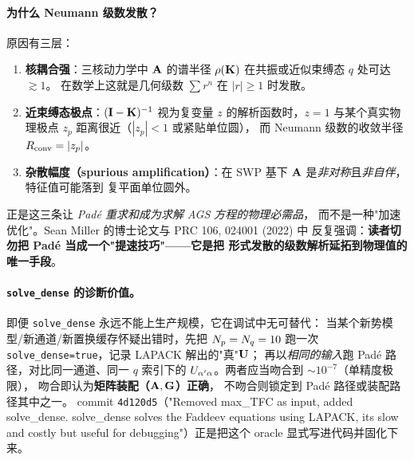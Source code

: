 \paragraph{为什么 Neumann 级数发散？}
原因有三层：
\begin{enumerate}
  \item \textbf{核耦合强}：三核动力学中 \(\mathbf{A}\) 的谱半径
        \(\rho(\mathbf{K})\) 在共振或近似束缚态 \(q\) 处可达 \(\gtrsim 1\)。
        在数学上这就是几何级数 \(\sum r^n\) 在 \(|r| \ge 1\) 时发散。
  \item \textbf{近束缚态极点}：\((\mathbf{I} - \mathbf{K})^{-1}\)
        视为复变量 \(z\) 的解析函数时，\(z = 1\) 与某个真实物理极点
        \(z_p\) 距离很近（\(|z_p| < 1\) 或紧贴单位圆），
        而 Neumann 级数的收敛半径 \(R_{\text{conv}} = |z_p|\)。
  \item \textbf{杂散幅度（spurious amplification）}：在 SWP 基下
        \(\mathbf{A}\) 是\emph{非对称}且\emph{非自伴}，特征值可能落到
        复平面单位圆外。
\end{enumerate}
正是这三条让 \emph{Padé 重求和成为求解 AGS 方程的物理必需品}，
而不是一种"加速优化"。Sean Miller 的博士论文与 PRC 106, 024001 (2022) 中
反复强调：\textbf{读者切勿把 Padé 当成一个"提速技巧"——它是把
形式发散的级数解析延拓到物理值的唯一手段}。

\paragraph{\texttt{solve\_dense} 的诊断价值。}
即便 \texttt{solve\_dense} 永远不能上生产规模，它在调试中无可替代：
当某个新势模型/新通道/新置换缓存怀疑出错时，先把 \(N_p=N_q=10\) 跑一次
\texttt{solve\_dense=true}，记录 LAPACK 解出的"真"\(\mathbf{U}\)；
再以\emph{相同的输入}跑 Padé 路径，对比同一通道、同一 \(q\) 索引下的
\(U_{\alpha'\alpha}\)。两者应当吻合到 \(\sim 10^{-7}\)（单精度极限），
吻合即认为\textbf{矩阵装配（\(\mathbf{A}, \mathbf{G}\)）正确}，
不吻合则锁定到 Padé 路径或装配路径其中之一。
commit \texttt{4d120d5}（"Removed max\_TFC as input, added solve\_dense.
solve\_dense solves the Faddeev equations using LAPACK, its slow and costly but
useful for debugging"）正是把这个 oracle 显式写进代码并固化下来。

